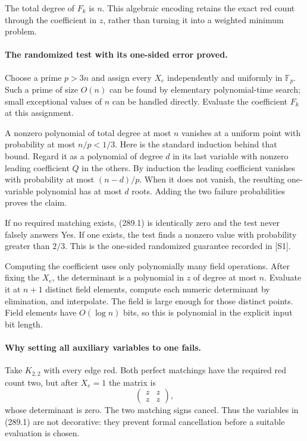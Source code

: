 \documentclass[11pt]{article}
\begin{document}
The total degree of $F_k$ is $n$. This algebraic encoding retains the exact red count through the coefficient in $z$, rather than turning it into a weighted minimum problem.

\paragraph{The randomized test with its one-sided error proved.}
Choose a prime $p>3n$ and assign every $X_e$ independently and uniformly in $\mathbb F_p$. Such a prime of size $O(n)$ can be found by elementary polynomial-time search; small exceptional values of $n$ can be handled directly. Evaluate the coefficient $F_k$ at this assignment.

A nonzero polynomial of total degree at most $n$ vanishes at a uniform point with probability at most $n/p<1/3$. Here is the standard induction behind that bound. Regard it as a polynomial of degree $d$ in its last variable with nonzero leading coefficient $Q$ in the others. By induction the leading coefficient vanishes with probability at most $(n-d)/p$. When it does not vanish, the resulting one-variable polynomial has at most $d$ roots. Adding the two failure probabilities proves the claim.

If no required matching exists, (289.1) is identically zero and the test never falsely answers Yes. If one exists, the test finds a nonzero value with probability greater than $2/3$. This is the one-sided randomized guarantee recorded in [S1].

Computing the coefficient uses only polynomially many field operations. After fixing the $X_e$, the determinant is a polynomial in $z$ of degree at most $n$. Evaluate it at $n+1$ distinct field elements, compute each numeric determinant by elimination, and interpolate. The field is large enough for those distinct points. Field elements have $O(\log n)$ bits, so this is polynomial in the explicit input bit length.

\paragraph{Why setting all auxiliary variables to one fails.}
Take $K_{2,2}$ with every edge red. Both perfect matchings have the required red count two, but after $X_e=1$ the matrix is
\[
 \begin{pmatrix}z&z\\z&z\end{pmatrix},
\]
whose determinant is zero. The two matching signs cancel. Thus the variables in (289.1) are not decorative: they prevent formal cancellation before a suitable evaluation is chosen.
\end{document}
